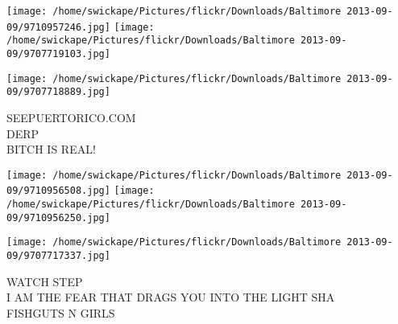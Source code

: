 \documentclass[10pt,letterpaper]{article}
\begin{document}
\texttt{[image: /home/swickape/Pictures/flickr/Downloads/Baltimore 2013-09-09/9710957246.jpg]}
\texttt{[image: /home/swickape/Pictures/flickr/Downloads/Baltimore 2013-09-09/9707719103.jpg]}

\vspace{0.25in}
\texttt{[image: /home/swickape/Pictures/flickr/Downloads/Baltimore 2013-09-09/9707718889.jpg]}

SEEPUERTORICO.COM\\
DERP\\
BITCH IS REAL!\\
\pagebreak

\texttt{[image: /home/swickape/Pictures/flickr/Downloads/Baltimore 2013-09-09/9710956508.jpg]}
\texttt{[image: /home/swickape/Pictures/flickr/Downloads/Baltimore 2013-09-09/9710956250.jpg]}

\vspace{0.25in}
\texttt{[image: /home/swickape/Pictures/flickr/Downloads/Baltimore 2013-09-09/9707717337.jpg]}

WATCH STEP\\
I AM THE FEAR THAT DRAGS YOU INTO THE LIGHT SHA\\
FISHGUTS N GIRLS\\
\pagebreak
\end{document}
